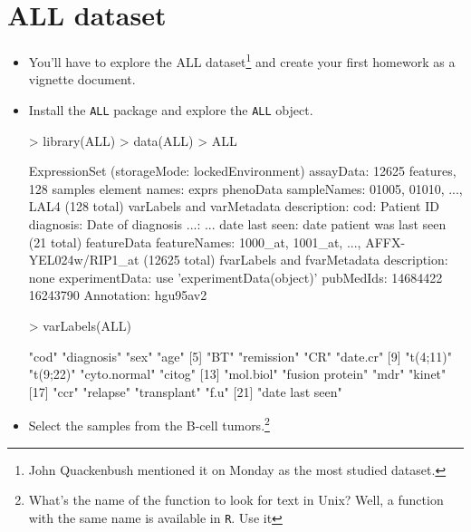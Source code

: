 \documentclass[letterpaper,12pt]{article}
\newcommand{\pl}[1]{\texttt{#1}}
\begin{document}
\section{ALL dataset}
  \begin{itemize}
  \item You'll have to explore the ALL dataset\footnote{John Quackenbush mentioned it on Monday as the most studied dataset.} and create your first homework as a vignette document.
  \item Install the \pl{ALL} package and explore the \pl{ALL} object.
\begin{Schunk}
\begin{Sinput}
> library(ALL)
> data(ALL)
> ALL
\end{Sinput}
\begin{Soutput}
ExpressionSet (storageMode: lockedEnvironment)
assayData: 12625 features, 128 samples 
  element names: exprs 
phenoData
  sampleNames: 01005, 01010, ..., LAL4  (128 total)
  varLabels and varMetadata description:
    cod:  Patient ID
    diagnosis:  Date of diagnosis
    ...: ...
    date last seen:  date patient was last seen
    (21 total)
featureData
  featureNames: 1000_at, 1001_at, ..., AFFX-YEL024w/RIP1_at  (12625 total)
  fvarLabels and fvarMetadata description: none
experimentData: use 'experimentData(object)'
  pubMedIds: 14684422 16243790 
Annotation: hgu95av2 
\end{Soutput}
\begin{Sinput}
> varLabels(ALL)
\end{Sinput}
\begin{Soutput}
 [1] "cod"            "diagnosis"      "sex"            "age"           
 [5] "BT"             "remission"      "CR"             "date.cr"       
 [9] "t(4;11)"        "t(9;22)"        "cyto.normal"    "citog"         
[13] "mol.biol"       "fusion protein" "mdr"            "kinet"         
[17] "ccr"            "relapse"        "transplant"     "f.u"           
[21] "date last seen"
\end{Soutput}
\end{Schunk}
  \item Select the samples from the B-cell tumors.\footnote{What's the name of the function to look for text in Unix? Well, a function with the same name is available in \pl{R}. Use it}
\begin{Schunk}
\end{Schunk}

\end{itemize}
\end{document}
